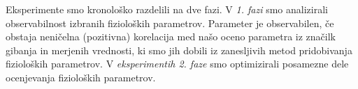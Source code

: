 Eksperimente smo kronološko razdelili na dve fazi. V \emph{1. fazi} smo analizirali observabilnost izbranih fizioloških parametrov. Parameter je observabilen, če obstaja neničelna (pozitivna) korelacija med našo oceno parametra iz značilk gibanja in merjenih vrednosti, ki smo jih dobili iz zanesljivih metod pridobivanja fizioloških parametrov. %
V \emph{eksperimentih 2. faze} smo optimizirali posamezne dele ocenjevanja fizioloških parametrov. %

\renewcommand{\folder}{./pogl/03-eksperimenti}


